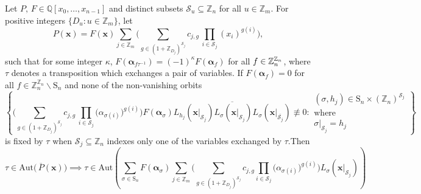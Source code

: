 \begin{lemma} \label{lem:symmetrization Lemma}
Let $P,\,F\in\mathbb{Q}\left[x_{0},\ldots,x_{n-1}\right]$
and distinct subsets $\mathscr{S}_{u}\subseteq\mathbb{Z}_{n}$ for all $u\in\mathbb{Z}_{m}$. For positive integers $\{D_{u}:u\in\mathbb{Z}_{m}\}$, let
\begin{equation}
P(\mathbf{x})=F(\mathbf{x})\sum_{j\in\mathbb{Z}_{m}}\big(\sum_{g\in(1+\mathbb{Z}_{D_{j}})^{\mathscr{S}_{j}}}c_{j,g}\,\prod_{i\in \mathscr{S}_{j}}(x_{i})^{g(i)}\big),
\end{equation}
such that for some integer $\kappa$, $F(\boldsymbol{\alpha}_{f\tau^{-1}})=(-1)^{\kappa} F(\boldsymbol{\alpha}_{f})$  
 for all $f\in {\mathbb Z}_{n}^{{\mathbb Z}_{n}}$,
 where $\tau$ denotes a transposition  which exchanges a pair of variables. If  $F(\boldsymbol{\alpha}_{f})=0$ for all $f\in \mathbb{Z}_{n}^{\mathbb{Z}_{n}}\backslash\text{S}_{n}$ and none of the non-vanishing orbits
 \[
\left\{ \bigg(\sum_{g\in(1+\mathbb{Z}_{D_{j}})^{\mathscr{S}_{j}}}c_{j,g}\,\prod_{i\in\mathscr{S}_{j}}\big(\alpha_{\sigma(i)}\big)^{g(i)}\bigg)F(\boldsymbol{\alpha}_{\sigma})\overline{L_{h_{j}}(\mathbf{x}|_{\mathscr{S}_{j}})L_{\sigma}(\mathbf{x}|_{\mathscr{S}_{j}})L_{\sigma}(\mathbf{x}|_{\overline{\mathscr{S}_{j}}})}\not\equiv0:\begin{array}{c}
(\sigma,h_{j})\in\text{S}_{n}\times(\mathbb{Z}_{n})^{\mathscr{S}_{j}}\\
\text{where}\\
\sigma|_{\mathscr{S}_{j}}=h_{j}
\end{array}\right\} 
 \]
is fixed by $\tau$ when $\mathscr{S}_{j}\subseteq\mathbb{Z}_{n}$ indexes only one of the variables exchanged by $\tau$.Then
\[
\tau\in\textrm{Aut}\big(\,\overline{P}(\mathbf{x})\big)\implies\tau\in\textrm{Aut}\left(\sum_{\sigma\in\text{S}_{n}}F(\boldsymbol{\alpha}_{\sigma})\sum_{j\in\mathbb{Z}_{m}}\bigg(\sum_{g\in(1+\mathbb{Z}_{D_{j}})^{\mathscr{S}_{j}}}c_{j,g}\prod_{i\in\mathscr{S}_{j}}\big(\alpha_{\sigma(i)}\big)^{g(i)}\bigg)L_{\sigma}(\mathbf{x}|_{\mathscr{S}_{j}})\right)
\]
\end{lemma}
